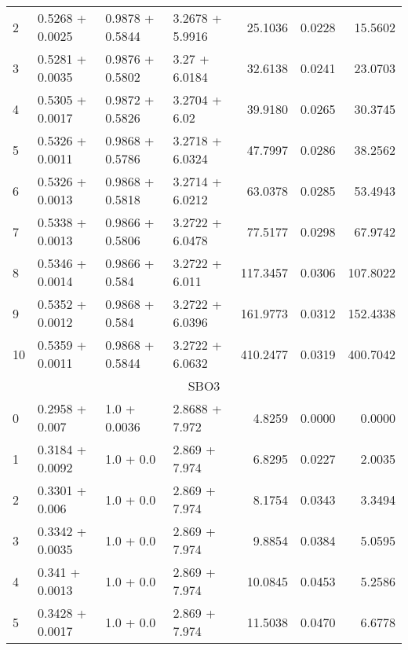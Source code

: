 \begin{tabular}{llllrrr}
  2  &  0.5268 + 0.0025 &  0.9878 + 0.5844 &  3.2678 + 5.9916 &             25.1036 &                 0.0228 &        15.5602 \\
  3  &  0.5281 + 0.0035 &  0.9876 + 0.5802 &    3.27 + 6.0184 &             32.6138 &                 0.0241 &        23.0703 \\
  4  &  0.5305 + 0.0017 &  0.9872 + 0.5826 &    3.2704 + 6.02 &             39.9180 &                 0.0265 &        30.3745 \\
  5  &  0.5326 + 0.0011 &  0.9868 + 0.5786 &  3.2718 + 6.0324 &             47.7997 &                 0.0286 &        38.2562 \\
  6  &  0.5326 + 0.0013 &  0.9868 + 0.5818 &  3.2714 + 6.0212 &             63.0378 &                 0.0285 &        53.4943 \\
  7  &  0.5338 + 0.0013 &  0.9866 + 0.5806 &  3.2722 + 6.0478 &             77.5177 &                 0.0298 &        67.9742 \\
  8  &  0.5346 + 0.0014 &   0.9866 + 0.584 &   3.2722 + 6.011 &            117.3457 &                 0.0306 &       107.8022 \\
  9  &  0.5352 + 0.0012 &   0.9868 + 0.584 &  3.2722 + 6.0396 &            161.9773 &                 0.0312 &       152.4338 \\
  10 &  0.5359 + 0.0011 &  0.9868 + 0.5844 &  3.2722 + 6.0632 &            410.2477 &                 0.0319 &       400.7042 \\
  \midrule
  \multicolumn{7}{c}{SBO3} \\
  \midrule
  0  &   0.2958 + 0.007 &  1.0 + 0.0036 &  2.8688 + 7.972 &              4.8259 &                 0.0000 &         0.0000 \\
  1  &  0.3184 + 0.0092 &     1.0 + 0.0 &   2.869 + 7.974 &              6.8295 &                 0.0227 &         2.0035 \\
  2  &   0.3301 + 0.006 &     1.0 + 0.0 &   2.869 + 7.974 &              8.1754 &                 0.0343 &         3.3494 \\
  3  &  0.3342 + 0.0035 &     1.0 + 0.0 &   2.869 + 7.974 &              9.8854 &                 0.0384 &         5.0595 \\
  4  &   0.341 + 0.0013 &     1.0 + 0.0 &   2.869 + 7.974 &             10.0845 &                 0.0453 &         5.2586 \\
  5  &  0.3428 + 0.0017 &     1.0 + 0.0 &   2.869 + 7.974 &             11.5038 &                 0.0470 &         6.6778 \\

\end{tabular}
